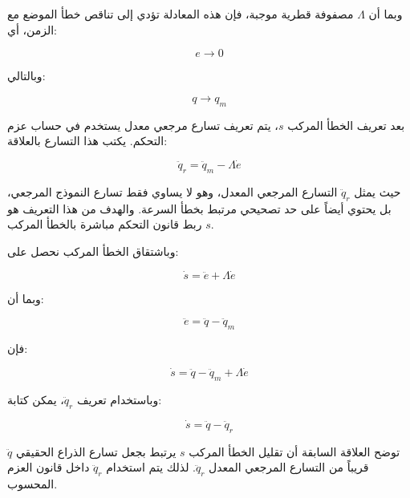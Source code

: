 وبما أن \(\Lambda\) مصفوفة قطرية موجبة، فإن هذه المعادلة تؤدي إلى تناقص خطأ الموضع مع الزمن، أي:

\begin{equation}
e\rightarrow 0
\label{eq:actc_error_convergence}
\end{equation}

وبالتالي:

\begin{equation}
q\rightarrow q_m
\label{eq:actc_tracking_goal}
\end{equation}

بعد تعريف الخطأ المركب \(s\)، يتم تعريف تسارع مرجعي معدل يستخدم في حساب عزم التحكم. يكتب هذا التسارع بالعلاقة:

\begin{equation}
\ddot{q}_r=
\ddot{q}_m
-
\Lambda \dot{e}
\label{eq:actc_modified_reference_acceleration}
\end{equation}

حيث يمثل \(\ddot{q}_r\) التسارع المرجعي المعدل، وهو لا يساوي فقط تسارع النموذج المرجعي، بل يحتوي أيضاً على حد تصحيحي مرتبط بخطأ السرعة. والهدف من هذا التعريف هو ربط قانون التحكم مباشرة بالخطأ المركب \(s\).

وباشتقاق الخطأ المركب نحصل على:

\begin{equation}
\dot{s}
=
\ddot{e}
+
\Lambda\dot{e}
\label{eq:actc_s_derivative_1}
\end{equation}

وبما أن:

\begin{equation}
\ddot{e}
=
\ddot{q}
-
\ddot{q}_m
\label{eq:actc_acceleration_error}
\end{equation}

فإن:

\begin{equation}
\dot{s}
=
\ddot{q}
-
\ddot{q}_m
+
\Lambda\dot{e}
\label{eq:actc_s_derivative_2}
\end{equation}

وباستخدام تعريف \(\ddot{q}_r\)، يمكن كتابة:

\begin{equation}
\dot{s}
=
\ddot{q}
-
\ddot{q}_r
\label{eq:actc_s_derivative_final}
\end{equation}

توضح العلاقة السابقة أن تقليل الخطأ المركب \(s\) يرتبط بجعل تسارع الذراع الحقيقي \(\ddot{q}\) قريباً من التسارع المرجعي المعدل \(\ddot{q}_r\). لذلك يتم استخدام \(\ddot{q}_r\) داخل قانون العزم المحسوب.

